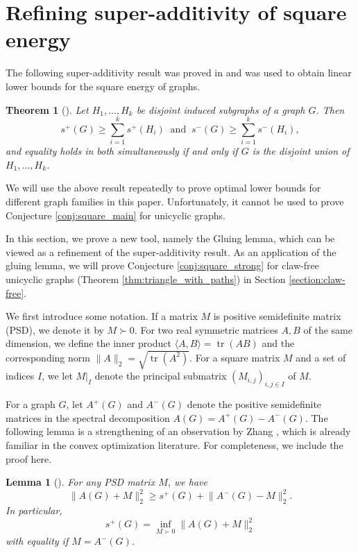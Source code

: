 \documentclass{article}
\newtheorem{theorem}{Theorem}[section]
\newtheorem{lemma}{Lemma}[section]
\DeclareMathOperator{\tr}{tr}
\newcommand{\norm}[1]{\lVert#1\rVert}
\begin{document}
\section{Refining super-additivity of square energy}

The following super-additivity result was proved in \cite{Akbari_2024_Linear, Zhang_2024_Extremal} and was used to obtain linear lower bounds for the square energy of graphs.

\begin{theorem}[\cite{Akbari_2024_Linear, Zhang_2024_Extremal}]\label{thm:square_energy_partition}
Let $H_1, \ldots, H_k$ be disjoint induced subgraphs of a graph $G$. Then 
\[s^+(G)\geq \sum_{i=1}^{k} s^+(H_i)\ \text{ and }\  s^-(G)\geq \sum_{i=1}^{k} s^-(H_i),\]
and equality holds in both simultaneously if and only if $G$ is the disjoint union of $H_1, \ldots, H_k$. 
\end{theorem} 

We will use the above result repeatedly to prove optimal lower bounds for different graph families in this paper. Unfortunately, it cannot be used to prove Conjecture \ref{conj:square_main} for unicyclic graphs. 

In this section, we prove a new tool, namely the Gluing lemma, which can be viewed as a refinement of the super-additivity result. As an application of the gluing lemma, we will prove Conjecture \ref{conj:square_strong} for claw-free unicyclic graphs (Theorem \ref{thm:triangle_with_paths}) in Section \ref{section:claw-free}.

We first introduce some notation. If a matrix $M$ is positive semidefinite matrix (PSD), we denote it by $M \succ 0$. For two real symmetric matrices $A, B$ of the same dimension, we define the inner product $\langle A, B\rangle = \tr(AB)$ and the corresponding norm $\norm{A}_2  = \sqrt{\tr(A^2)}$. For a square matrix $M$ and a set of indices $I$, we let $M|_I$ denote the principal submatrix $(M_{i,j})_{i,j\in I}$ of $M$.

For a graph $G$, let $A^+(G)$ and $A^-(G)$ denote the positive semidefinite matrices in the spectral decomposition $A(G) = A^+(G) - A^-(G)$. The following lemma is a strengthening of an observation by Zhang \cite{Zhang_2024_Extremal}, which is already familiar in the convex optimization literature. For completeness, we include the proof here.

\begin{lemma}[\cite{Zhang_2024_Extremal}]\label{lem:pythagorean}
For any PSD matrix $M$, we have 
    \[\norm{A(G) + M}_2^2 \geq s^+(G) + \norm{A^-(G) - M}_2^2. \]
In particular, $$s^+(G) = \inf_{M \succ 0} \norm{A(G) + M}_2^2$$
with equality if $M = A^-(G)$.     
\end{lemma}
\end{document}
